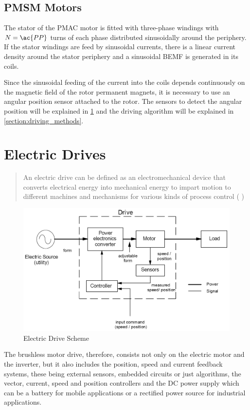 \subsection{PMSM Motors}

The stator of the \ac{PMAC} motor is fitted with three-phase windings with $N=\ac{PP}$ turns of each phase distributed sinusoidally around the periphery. If the stator windings are feed by sinusoidal currents, there is a linear current density around the stator periphery and a sinusoidal \ac{BEMF} is generated in its coils.

Since the sinusoidal feeding of the current into the coils depends continuously on the magnetic field of the rotor permanent magnets, it is necessary to use an angular position sensor attached to the rotor. The sensors to detect the angular position will be explained in \ref{section:drives} and the driving algorithm will be explained in \ref{section:driving_methods}.

\section{Electric Drives}\label{section:drives}

\blockquote{An electric drive can be defined as an electromechanical device that converts electrical energy into mechanical energy to impart motion to different machines and mechanisms for various kinds of process control (\citeauthor{GhioniElecDrives} )}.

\begin{figure}[htbp]
	\centering
	\includegraphics[width=12cm]{Images/electric_drive.png} 
	\caption[Electric Drive Scheme]{Electric Drive Scheme}
	\label{fig:drive}
\end{figure}

The brushless motor drive, therefore, consists not only on the electric motor and the inverter, but it also includes the position, speed and current feedback systems, these being external sensors, embedded circuits or just algorithms, the vector, current, speed and position controllers and the \ac{DC} power supply which can be a battery for mobile applications or a rectified power source for industrial applications.

